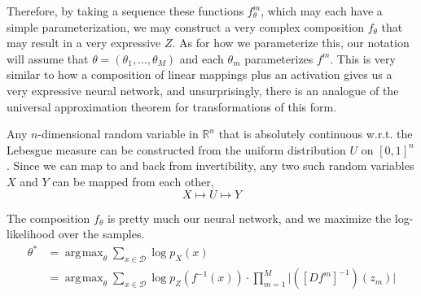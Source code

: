 \documentclass{article}
\DeclareMathOperator*{\argmax}{\arg\!\max}
\begin{document}
  Therefore, by taking a sequence these functions $f^m_\theta$, which may each have a simple parameterization, we may construct a very complex composition $f_\theta$ that may result in a very expressive $Z$. As for how we parameterize this, our notation will assume that $\theta = (\theta_1, \ldots, \theta_M)$ and each $\theta_m$ parameterizes $f^m$. This is very similar to how a composition of linear mappings plus an activation gives us a very expressive neural network, and unsurprisingly, there is an analogue of the universal approximation theorem for transformations of this form. 

  \begin{theorem} 
    Any $n$-dimensional random variable in $\mathbb{R}^n$ that is absolutely continuous w.r.t. the Lebesgue measure can be constructed from the uniform distribution $U$ on $[0, 1]^n$. Since we can map to and back from invertibility, any two such random variables $X$ and $Y$ can be mapped from each other, 
    \begin{equation}
      X \mapsto U \mapsto Y 
    \end{equation}
  \end{theorem} 

  The composition $f_\theta$ is pretty much our neural network, and we maximize the log-likelihood over the samples. 
  \begin{align}
    \theta^\ast & = \argmax_{\theta} \sum_{x \in \mathcal{D}} \log p_X (x) \\  
                & = \argmax_{\theta} \sum_{x \in \mathcal{D}} \log p_Z (f^{-1} (x)) \cdot \prod_{m=1}^M \big|([D f^m]^{-1})(z_m) \big|
  \end{align}

 
 
 
 



\end{document}

